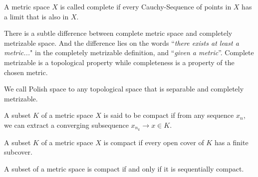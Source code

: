 \begin{definition}[Completeness]
	A metric space $X$ is called complete if every Cauchy-Sequence of points in $X$ has a limit that is also in $X$. 
\end{definition}

\begin{definition}
	
\end{definition}
There is a subtle difference between complete metric space and completely metrizable space.  And the difference lies on the words ``\textit{there exists at least a metric...}" in the completely metrizable definition, and ``\textit{given a metric}''. Complete metrizable is a topological property while completeness is a property of the chosen metric.
\begin{definition}
	We call Polish space to any topological space that is separable and completely metrizable.
\end{definition}

\begin{definition}
	A subset $K$ of a metric space $X$ is said to be compact if from any sequence $x_n$, we can extract a converging subsequence $x_{n_k} \rightarrow x \in K$.
\end{definition}

\begin{definition}[Compactness]
		A subset $K$ of a metric space $X$ is compact if every open cover of $K$ has a finite subcover. 
\end{definition}

\begin{theorem}
	A subset of a metric space is compact if and only if it is sequentially compact.
\end{theorem}


